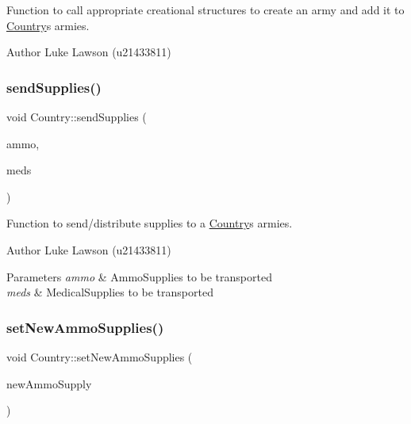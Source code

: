 Function to call appropriate creational structures to create an army and add it to \mbox{\hyperlink{class_country}{Country}}\textquotesingle{}s armies. 

\begin{DoxyAuthor}{Author}
Luke Lawson (u21433811) 
\end{DoxyAuthor}
\mbox{\label{class_country_ae14d96ddafd2eb7b9c173fb26908fab7}} 
\subsubsection{\texorpdfstring{sendSupplies()}{sendSupplies()}}
{\footnotesize\ttfamily void Country\+::send\+Supplies (\begin{DoxyParamCaption}\item[{\mbox{\hyperlink{class_ammo_supply}{Ammo\+Supply}} $\ast$}]{ammo,  }\item[{\mbox{\hyperlink{class_medical_supply}{Medical\+Supply}} $\ast$}]{meds }\end{DoxyParamCaption})}



Function to send/distribute supplies to a \mbox{\hyperlink{class_country}{Country}}\textquotesingle{}s armies. 

\begin{DoxyAuthor}{Author}
Luke Lawson (u21433811) 
\end{DoxyAuthor}

\begin{DoxyParams}{Parameters}
{\em ammo} & Ammo\+Supplies to be transported \\
\hline
{\em meds} & Medical\+Supplies to be transported \\
\hline
\end{DoxyParams}
\mbox{\label{class_country_a39b4294819a0b5e2513d4093401ec6a7}} 
\subsubsection{\texorpdfstring{setNewAmmoSupplies()}{setNewAmmoSupplies()}}
{\footnotesize\ttfamily void Country\+::set\+New\+Ammo\+Supplies (\begin{DoxyParamCaption}\item[{\mbox{\hyperlink{class_ammo_supply}{Ammo\+Supply}} $\ast$}]{new\+Ammo\+Supply }\end{DoxyParamCaption})}




